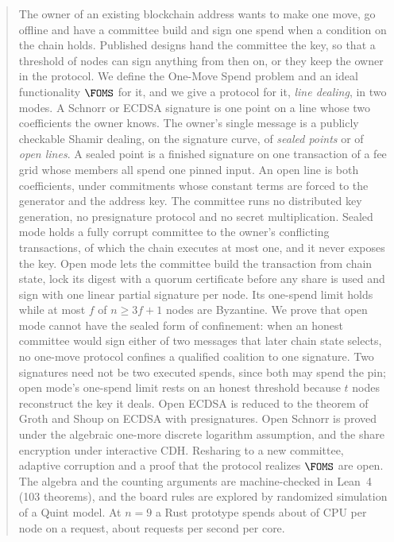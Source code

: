 \begin{abstract}
The owner of an existing blockchain address wants to make one move, go offline and have a committee build and sign one spend when a condition on the chain holds. Published designs hand the committee the key, so that a threshold of nodes can sign anything from then on, or they keep the owner in the protocol. We define the One-Move Spend problem and an ideal functionality $\FOMS$ for it, and we give a protocol for it, \emph{line dealing}, in two modes. A Schnorr or ECDSA signature is one point on a line whose two coefficients the owner knows. The owner's single message is a publicly checkable Shamir dealing, on the signature curve, of \emph{sealed points} or of \emph{open lines}. A sealed point is a finished signature on one transaction of a fee grid whose members all spend one pinned input. An open line is both coefficients, under commitments whose constant terms are forced to the generator and the address key. The committee runs no distributed key generation, no presignature protocol and no secret multiplication. Sealed mode holds a fully corrupt committee to the owner's conflicting transactions, of which the chain executes at most one, and it never exposes the key. Open mode lets the committee build the transaction from chain state, lock its digest with a quorum certificate before any share is used and sign with one linear partial signature per node. Its one-spend limit holds while at most $f$ of $n \ge 3f+1$ nodes are Byzantine. We prove that open mode cannot have the sealed form of confinement: when an honest committee would sign either of two messages that later chain state selects, no one-move protocol confines a qualified coalition to one signature. Two signatures need not be two executed spends, since both may spend the pin; open mode's one-spend limit rests on an honest threshold because $t$ nodes reconstruct the key it deals. Open ECDSA is reduced to the theorem of Groth and Shoup on ECDSA with presignatures. Open Schnorr is proved under the algebraic one-more discrete logarithm assumption, and the share encryption under interactive CDH. Resharing to a new committee, adaptive corruption and a proof that the protocol realizes $\FOMS$ are open. The algebra and the counting arguments are machine-checked in Lean~4 (103 theorems), and the board rules are explored by randomized simulation of a Quint model. At $n = 9$ a Rust prototype spends about \nineNodeMicrosLow{}\us{} of CPU per node on a request, about \nineReqPerCoreLow{} requests per second per core.
\end{abstract}

